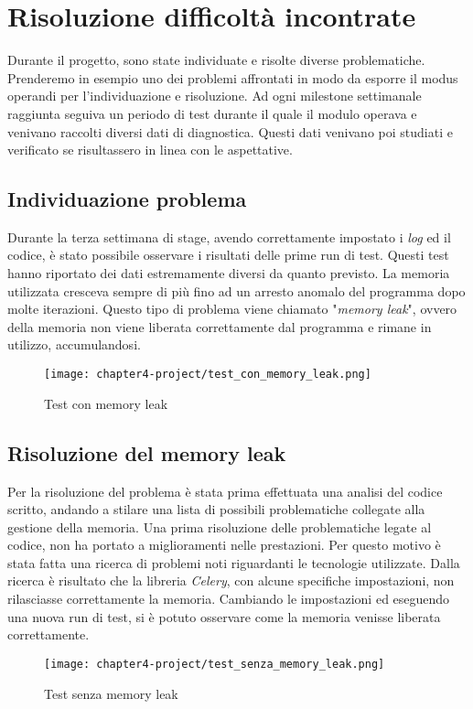 \section{Risoluzione difficoltà incontrate}

Durante il progetto, sono state individuate e risolte diverse problematiche. Prenderemo in esempio uno dei problemi affrontati in modo da esporre il modus operandi per l'individuazione e risoluzione.
Ad ogni milestone settimanale raggiunta seguiva un periodo di test durante il quale il modulo operava e venivano raccolti diversi dati di diagnostica. Questi dati venivano poi studiati e verificato se risultassero in linea con le aspettative.

\subsection{Individuazione problema}
Durante la terza settimana di stage, avendo correttamente impostato i \emph{log} ed il codice, è stato possibile osservare i risultati delle prime run di test. Questi test hanno riportato dei dati estremamente diversi da quanto previsto. La memoria utilizzata cresceva sempre di più fino ad un arresto anomalo del programma dopo molte iterazioni. Questo tipo di problema viene chiamato "\emph{memory leak}", ovvero della memoria non viene liberata correttamente dal programma e rimane in utilizzo, accumulandosi.

\begin{figure}[!h] 
    \centering 
    \texttt{[image: chapter4-project/test\_con\_memory\_leak.png]} 
    \caption{Test con memory leak}
\end{figure}

\subsection{Risoluzione del memory leak}

Per la risoluzione del problema è stata prima effettuata una analisi del codice scritto, andando a stilare una lista di possibili problematiche collegate alla gestione della memoria. Una prima risoluzione delle problematiche legate al codice, non ha portato a miglioramenti nelle prestazioni. Per questo motivo è stata fatta una ricerca di problemi noti riguardanti le tecnologie utilizzate. Dalla ricerca è risultato che la libreria \emph{Celery}, con alcune specifiche impostazioni, non rilasciasse correttamente la memoria. Cambiando le impostazioni ed eseguendo una nuova run di test, si è potuto osservare come la memoria venisse liberata correttamente.

\begin{figure}[!h] 
    \centering 
    \texttt{[image: chapter4-project/test\_senza\_memory\_leak.png]} 
    \caption{Test senza memory leak}
\end{figure}